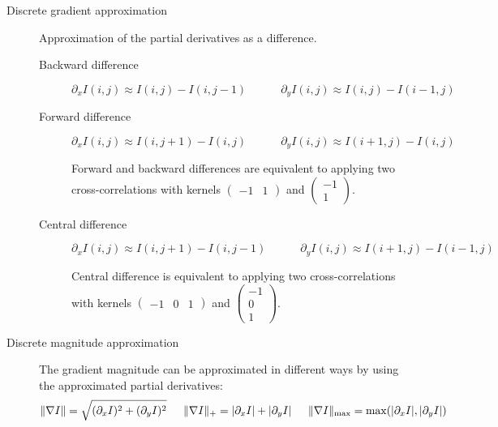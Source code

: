 \begin{description}
    \item[Discrete gradient approximation] 
        Approximation of the partial derivatives as a difference.
        \begin{description}
            \item[Backward difference] 
                \[ \partial_x I(i, j) \approx I(i, j) - I(i, j-1) \hspace{3em} \partial_y I(i, j) \approx I(i, j) - I(i-1, j) \]


            \item[Forward difference] 
                \[ \partial_x I(i, j) \approx I(i, j+1) - I(i, j) \hspace{3em} \partial_y I(i, j) \approx I(i+1, j) - I(i, j) \]

            \begin{remark}
                Forward and backward differences are equivalent to applying two cross-correlations with kernels 
                $\begin{pmatrix} -1 & 1 \end{pmatrix}$ and $\begin{pmatrix} -1 \\ 1 \end{pmatrix}$.
            \end{remark}

            \item[Central difference] 
                \[ \partial_x I(i, j) \approx I(i, j+1) - I(i, j-1) \hspace{3em} \partial_y I(i, j) \approx I(i+1, j) - I(i-1, j) \]
                
                \begin{remark}
                    Central difference is equivalent to applying two cross-correlations with kernels 
                    $\begin{pmatrix} -1 & 0 & 1 \end{pmatrix}$ and $\begin{pmatrix} -1 \\ 0 \\ 1 \end{pmatrix}$.
                \end{remark}
        \end{description}

    \item[Discrete magnitude approximation] 
        The gradient magnitude can be approximated in different ways by using the approximated partial derivatives:
        \[ 
            \Vert \nabla I \Vert = \sqrt{(\partial_x I)^2 + (\partial_y I)^2} \hspace{1.5em}
            \Vert \nabla I \Vert_+ = \vert \partial_x I \vert + \vert \partial_y I \vert \hspace{1.5em}
            \Vert \nabla I \Vert_\text{max} = \max(\vert \partial_x I \vert, \vert \partial_y I \vert)
        \]


\end{description}
